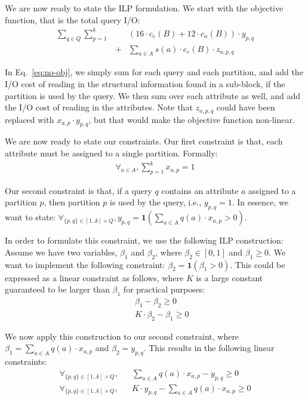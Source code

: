 We are now ready to state the ILP formulation. We start with the objective
function, that is the total query I/O:
\begin{eqnarray}
\sum_{q\in Q} \sum_{p=1}^{k} && (16\cdot c_e(B) + 12\cdot c_n(B))\cdot
y_{p,q}\nonumber\\ 
&+& \sum_{a\in A} s(a)\cdot c_e(B)\cdot z_{a,p,q}\label{eq:no-obj}
\end{eqnarray}

In Eq.~\ref{eq:no-obj}, we simply sum for each query and each partition, and
add the I/O cost of reading in the structural information found in a
sub-block, if the partition is used by the query. We then sum over each
attribute as well, and add the I/O cost of reading in the attributes. Note
that $z_{a,p,q}$ could have been  replaced with $x_{a,p}\cdot y_{p,q}$, but
that would make the objective function non-linear. 

We are now ready to state our constraints. Our first constraint is that, each
attribute must be assigned to a single partition. Formally:
\begin{eqnarray}
\forall_{a\in A}, \sum_{p=1}^{k} x_{a,p} = 1
\end{eqnarray}

Our second constraint is that, if a query $q$ contains an attribute $a$
assigned to a partition $p$, then partition $p$ is used by the query, i.e.,
$y_{p,q}=1$. In essence, we want to state: $\forall_{\{p,q\}\in [1..k]\times
Q}, y_{p,q} = \mathbf{1}(\sum_{a\in A} q(a)\cdot x_{a,p}>0)$. 

In order to formulate this constraint, we use the following ILP  construction:
Assume we have two variables, $\beta_1$ and $\beta_2$, where $\beta_2\in[0,1]$
and $\beta_1\geq 0$. We want to implement the following constraint: $\beta_2 =
\mathbf{1}(\beta_1 > 0)$. This could be expressed as a linear constraint as
follows, where $K$ is a large constant guaranteed to be larger than $\beta_1$
for practical purposes:
\begin{eqnarray}
&& \beta_1 - \beta_2 \geq 0\nonumber\\
&& K\cdot\beta_2 - \beta_1 \geq 0\nonumber
\end{eqnarray}

We now apply this construction to our second constraint, where
$\beta_1=\sum_{a\in A} q(a)\cdot x_{a,p}$ and $\beta_2=y_{p,q}$. This results
in the following linear constraints:
\begin{eqnarray}
\forall_{\{p,q\}\in [1..k]\times Q}, 
    &&  \sum_{a\in A} q(a)\cdot x_{a,p} - y_{p,q} \geq 0 \nonumber\\
\forall_{\{p,q\}\in [1..k]\times Q}, 
    &&  K\cdot y_{p,q} - \sum_{a\in A} q(a)\cdot x_{a,p}  \geq 0 
\end{eqnarray}

